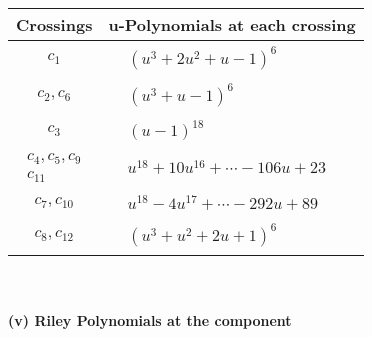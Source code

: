 \documentclass[1p]{elsarticle_modified}
\theoremstyle{definition}
\begin{document}
\begin{tabular}{m{50pt}|m{274pt}}
Crossings & \hspace{64pt}u-Polynomials at each crossing \\
\hline $$\begin{aligned}c_{1}\end{aligned}$$&$\begin{aligned}
&(u^3+2 u^2+u-1)^6
\end{aligned}$\\
\hline $$\begin{aligned}c_{2},c_{6}\end{aligned}$$&$\begin{aligned}
&(u^3+u-1)^6
\end{aligned}$\\
\hline $$\begin{aligned}c_{3}\end{aligned}$$&$\begin{aligned}
&(u-1)^{18}
\end{aligned}$\\
\hline $$\begin{aligned}c_{4},c_{5},c_{9}\\c_{11}\end{aligned}$$&$\begin{aligned}
&u^{18}+10 u^{16}+\cdots-106 u+23
\end{aligned}$\\
\hline $$\begin{aligned}c_{7},c_{10}\end{aligned}$$&$\begin{aligned}
&u^{18}-4 u^{17}+\cdots-292 u+89
\end{aligned}$\\
\hline $$\begin{aligned}c_{8},c_{12}\end{aligned}$$&$\begin{aligned}
&(u^3+u^2+2 u+1)^6
\end{aligned}$\\
\hline
\end{tabular}\\~\\
\newpage\renewcommand{\arraystretch}{1}
\flushleft \textbf{(v) Riley Polynomials at the component}\newline \\
\end{document}
